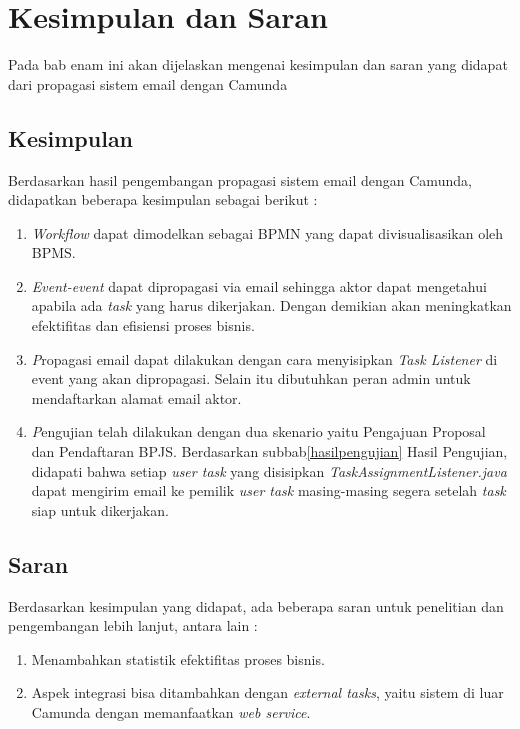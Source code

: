 \chapter{Kesimpulan dan Saran}
\label{chap:kesimpulan_saran}
Pada bab enam ini akan dijelaskan mengenai kesimpulan dan saran yang didapat dari propagasi sistem email dengan Camunda 
\section{Kesimpulan}
\label{sec:kesimpulan}
Berdasarkan hasil pengembangan propagasi sistem email dengan Camunda, didapatkan beberapa kesimpulan sebagai berikut :
\begin{enumerate}
	\item \textit{Workflow} dapat dimodelkan sebagai BPMN yang dapat divisualisasikan oleh BPMS. 
	\item \textit{Event-event} dapat dipropagasi via email sehingga aktor dapat mengetahui apabila ada \textit{task} yang harus dikerjakan. Dengan demikian akan meningkatkan efektifitas dan efisiensi proses bisnis.
	\item \textit Propagasi email dapat dilakukan dengan cara menyisipkan \textit{Task Listener} di event yang akan dipropagasi. Selain itu dibutuhkan peran admin untuk mendaftarkan alamat email aktor.
	\item \textit Pengujian telah dilakukan dengan dua skenario yaitu Pengajuan Proposal dan Pendaftaran BPJS. Berdasarkan subbab\ref{hasilpengujian} Hasil Pengujian, didapati bahwa setiap \textit{user task} yang disisipkan \textit{TaskAssignmentListener.java} dapat mengirim email ke pemilik \textit{user task} masing-masing segera setelah \textit{task} siap untuk dikerjakan.
	

\end{enumerate}

\section{Saran}
\label{sec:saran}
Berdasarkan kesimpulan yang didapat, ada beberapa saran untuk penelitian dan pengembangan lebih lanjut, antara lain :
\begin{enumerate}
	\item Menambahkan statistik efektifitas proses bisnis.
	\item Aspek integrasi bisa ditambahkan dengan \textit{external tasks}, yaitu sistem di luar Camunda dengan memanfaatkan \textit{web service}.
\end{enumerate}